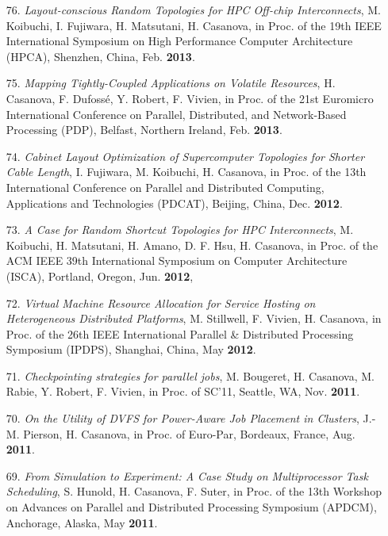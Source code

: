 \begin{enumerate}
\item[76.] {\it Layout-conscious Random Topologies for HPC Off-chip Interconnects}, 
M. Koibuchi, I. Fujiwara, H. Matsutani, H. Casanova,
in Proc. of the 19th IEEE International Symposium on High Performance Computer Architecture (HPCA), Shenzhen, China, Feb. {\bf 2013}.

\item[75.] {\it Mapping Tightly-Coupled Applications on Volatile Resources}, H.
Casanova, F. Dufoss\'e, Y. Robert, F. Vivien, in Proc. of the 21st
Euromicro International Conference on Parallel, Distributed, and Network-Based
Processing  (PDP), Belfast, Northern Ireland, Feb. {\bf 2013}.


\item[74.] {\it Cabinet Layout Optimization of Supercomputer Topologies for
Shorter Cable Length}, I. Fujiwara, M. Koibuchi, H. Casanova, in Proc. of
the 13th International Conference on Parallel and Distributed Computing,
Applications and Technologies (PDCAT), Beijing, China, Dec. {\bf 2012}.

\item[73.] {\it A Case for Random Shortcut Topologies for HPC Interconnects}, M.
Koibuchi, H. Matsutani, H. Amano, D. F. Hsu, H. Casanova, 
in Proc. of the ACM IEEE 39th International Symposium on Computer
Architecture (ISCA), Portland, Oregon, Jun. {\bf 2012},


\item[72.] {\it Virtual Machine Resource Allocation for Service Hosting on Heterogeneous Distributed Platforms}, M. Stillwell, F. Vivien, H. Casanova,
in Proc. of the 26th  IEEE International
Parallel \& Distributed Processing Symposium (IPDPS), Shanghai,
China, May {\bf 2012}.  


\item[71.] {\it Checkpointing strategies for parallel jobs}, M.
Bougeret, H. Casanova, M. Rabie, Y. Robert, F. Vivien, in Proc.
of SC'11, Seattle, WA, Nov. {\bf 2011}.


\item[70.] {\it On the Utility of DVFS for Power-Aware Job Placement
in Clusters}, J.-M. Pierson, H. Casanova, in Proc. of Euro-Par,
Bordeaux, France, Aug. {\bf 2011}.


\item[69.] {\it From Simulation to Experiment: A Case Study on
Multiprocessor Task Scheduling}, S. Hunold, H. Casanova, F. Suter, in
Proc. of the 13th Workshop on Advances on Parallel and
Distributed Processing Symposium (APDCM), Anchorage, Alaska,
May {\bf 2011}.


\end{enumerate}
